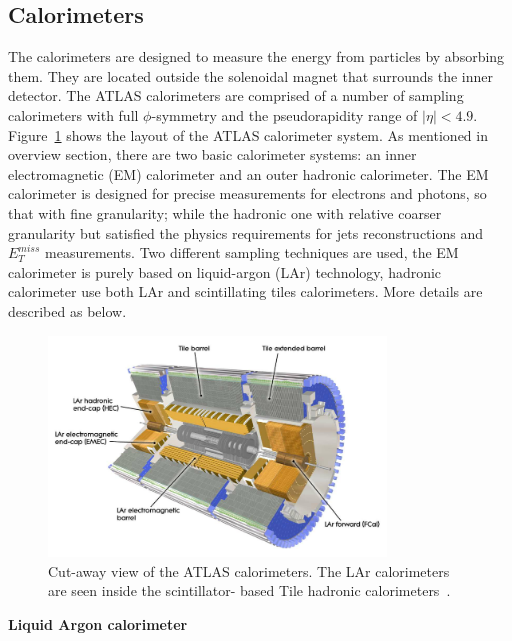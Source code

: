\subsection{Calorimeters}

The calorimeters are designed to measure the energy from particles by absorbing them.
They are located outside the solenoidal magnet that surrounds the inner detector.
The ATLAS calorimeters are comprised of a number of sampling calorimeters with full $\phi$-symmetry and the pseudorapidity range of $|\eta|<4.9$.
Figure~\ref{fig:calo_dec} shows the layout of the ATLAS calorimeter system.
As mentioned in overview section, there are two basic calorimeter systems: an inner electromagnetic (EM) calorimeter and an outer hadronic calorimeter.
The EM calorimeter is designed for precise measurements for electrons and photons, so that with fine granularity;
while the hadronic one with relative coarser granularity but satisfied the physics requirements for jets reconstructions and $E_{T}^{miss}$ measurements.
Two different sampling techniques are used, the EM calorimeter is purely based on liquid-argon (LAr) technology, hadronic calorimeter use both LAr and scintillating tiles calorimeters. 
More details are described as below.
\begin{figure}[!htb]
  \centering
  \includegraphics[width=0.8\textwidth]{figures/Detector/calo_layout.png}
  \caption{Cut-away view of the ATLAS calorimeters. The LAr calorimeters are seen inside the scintillator- based Tile hadronic calorimeters~\cite{Buchanan:2008}.}
  \label{fig:calo_dec}
\end{figure}

\textbf{Liquid Argon calorimeter}

